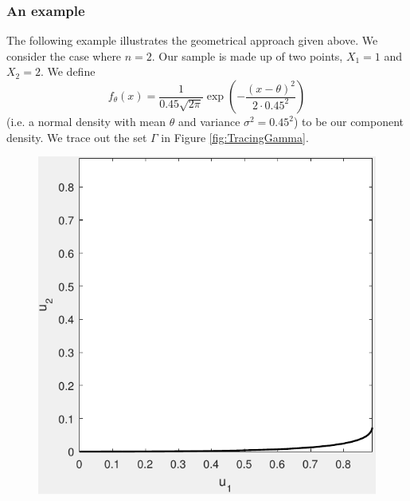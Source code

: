 	\subsubsection{An example}
		\label{sec:mixturelikelihoods:example}
		The following example illustrates the geometrical approach given above. We consider the case where $n = 2$. Our sample is made up of two points, $X_1 = 1$ and $X_2 = 2$. We define
		\begin{equation}
		f_\theta(x) = \frac{1}{0.45 \sqrt{2 \pi}} \exp\left(-\frac{(x-\theta)^2}{2\cdot 0.45^2}\right)
		\end{equation}
		(i.e. a normal density with mean $\theta$ and variance $\sigma^2 = 0.45^2$) to be our component density.
		We trace out the set $\Gamma$ in Figure \ref{fig:TracingGamma}. 

		\begin{figure}[ht]
			\centering
			\begin{minipage}[b]{0.3\linewidth}
				\includegraphics[width=\textwidth]{GammaTrace01}
			\end{minipage}
			\begin{minipage}[b]{0.3\linewidth}

\end{minipage}
\end{figure}
